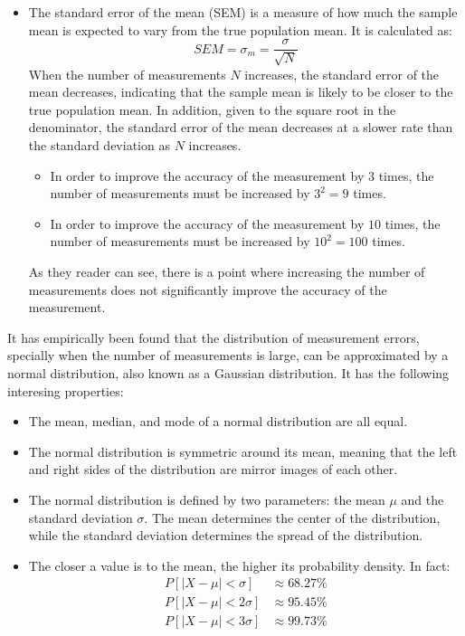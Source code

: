 \begin{itemize}
    \item The standard error of the mean (SEM) is a measure of how much the sample mean is expected to vary from the true population mean. It is calculated as:
    \begin{equation*}
        SEM = \sigma_m = \dfrac{\sigma}{\sqrt{N}}
    \end{equation*}
    When the number of measurements $N$ increases, the standard error of the mean decreases, indicating that the sample mean is likely to be closer to the true population mean. In addition, given to the square root in the denominator, the standard error of the mean decreases at a slower rate than the standard deviation as $N$ increases.
    \begin{itemize}
        \item In order to improve the accuracy of the measurement by $3$ times, the number of measurements must be increased by $3^2 = 9$ times.
        \item In order to improve the accuracy of the measurement by $10$ times, the number of measurements must be increased by $10^2 = 100$ times.
    \end{itemize}
    As they reader can see, there is a point where increasing the number of measurements does not significantly improve the accuracy of the measurement.
\end{itemize}

It has empirically been found that the distribution of measurement errors, specially when the number of measurements is large, can be approximated by a normal distribution, also known as a Gaussian distribution. It has the following interesing properties:
\begin{itemize}
    \item The mean, median, and mode of a normal distribution are all equal.
    \item The normal distribution is symmetric around its mean, meaning that the left and right sides of the distribution are mirror images of each other.
    \item The normal distribution is defined by two parameters: the mean $\mu$ and the standard deviation $\sigma$. The mean determines the center of the distribution, while the standard deviation determines the spread of the distribution.
    \item The closer a value is to the mean, the higher its probability density. In fact:
    \begin{align*}
        P[|X - \mu| < \sigma] &\approx 68.27\% \\
        P[|X - \mu| < 2\sigma] &\approx 95.45\% \\
        P[|X - \mu| < 3\sigma] &\approx 99.73\%
    \end{align*}
\end{itemize}


